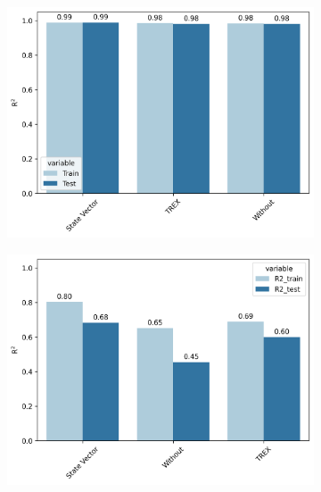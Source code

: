 \documentclass[journal=jacsat,manuscript=article]{achemso}
\begin{document}
\begin{figure}[H]
\begin{subfigure}[b]{0.49\textwidth}
		\caption{}
		\label{fig:sine_learning_curves}
	\end{subfigure}	
	\caption{}
	\label{fig:functionfitting_learning_curves}	
\end{figure}




\begin{figure}[H]
	\centering	
	\begin{subfigure}[b]{0.49\textwidth}
		\centering
		\includegraphics[width=\linewidth]{../images/Function_Fitting/linear_error_mitigation.png}
		\caption{}
		\label{fig:linear_error_mitigation}
	\end{subfigure}
	\hfill	
	\begin{subfigure}[b]{0.49\textwidth}
		\centering
		\includegraphics[width=\linewidth]{../images/Function_Fitting/quadratic_error_mitigation.png}
		\caption{}
		\label{fig:linear_error_mitigation}
	\end{subfigure}	
	\caption{}
	\label{fig:functionfitting_errormitigation}	
\end{figure}
\end{document}

